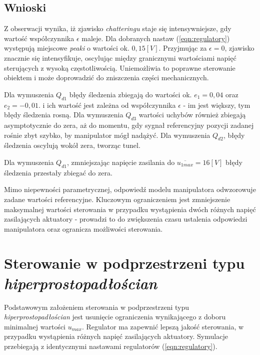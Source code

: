 \documentclass[10pt, a4paper, polish]{article}
\begin{document}
	\subsection{Wnioski}
	Z obserwacji wynika, iż zjawisko \textit{chatteringu} staje się intensywniejsze, gdy wartość współczynnika $\epsilon$ maleje. Dla dobranych nastaw (\ref*{eqn:regulatory}) występują miejscowe \textit{peaki} o wartości ok. $0,15 [V]$. Przyjmując za $\epsilon=0$, zjawisko znacznie się intensyfikuje, oscylując między granicznymi wartościami napięć sterujących z wysoką częstotliwością. Uniemożliwia to poprawne sterowanie obiektem i może doprowadzić do zniszczenia części mechanicznych.  
	
	Dla wymuszenia $Q_{d1}$ błędy śledzenia zbiegają do wartości ok. $e_1=0,04$ oraz $e_2=-0,01$. i ich wartość jest zależna od współczynnika $\epsilon$ - im jest większy, tym błędy śledzenia rosną. Dla wymuszenia $Q_{d3}$ wartości uchybów również zbiegają asymptotycznie do zera, aż do momentu, gdy sygnał referencyjny pozycji zadanej rośnie zbyt szybko, by manipulator mógł nadążyć. Dla wymuszenia $Q_{d2}$, błędy śledzenia oscylują wokół zera, tworząc tunel.
	
	Dla wymuszenia $Q_{d1}$, zmniejszając napięcie zasilania do $\overline{u_{1max}}=16[V]$ błędy śledzenia przestały zbiegać do zera.
	
	Mimo niepewności parametrycznej, odpowiedź modelu manipulatora odwzorowuje zadane wartości referencyjne. Kluczowym ograniczeniem jest zmniejszenie maksymalnej wartości sterowania w przypadku wystąpienia dwóch różnych napięć zasilających aktuatory - prowadzi to do zwiększenia czasu ustalenia odpowiedzi manipulatora oraz ogranicza możliwości sterowania.
	
	\section{Sterowanie w podprzestrzeni typu \textit{hiperprostopadłościan}}
	Podstawowym założeniem sterowania w podprzestrzeni typu \textit{hiperprostopadłościan} jest usunięcie ograniczenia wynikającego z doboru minimalnej wartości $u_{max}$. Regulator ma zapewnić lepszą jakość sterowania, w przypadku wystąpienia różnych napięć zasilających aktuatory. Symulacje przebiegają z identycznymi nastawami regulatorów (\ref{eqn:regulatory}). 
	
\end{document}
